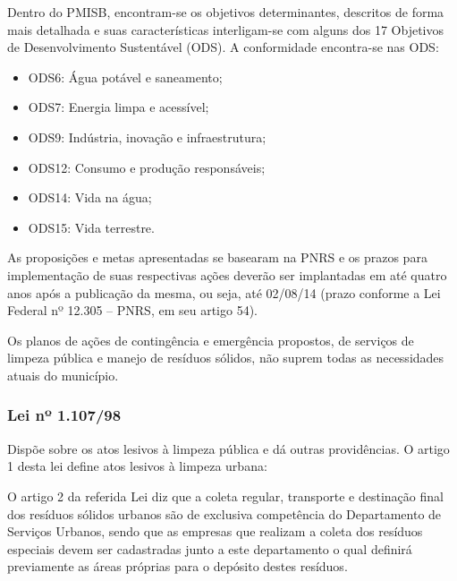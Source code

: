 	Dentro do PMISB, encontram-se os objetivos determinantes, descritos de forma mais detalhada e suas características interligam-se com alguns dos 17 Objetivos de Desenvolvimento Sustentável (ODS). A conformidade encontra-se nas ODS:

	\begin{itemize}
		\item ODS6: Água potável e saneamento;
		\item ODS7: Energia limpa e acessível;
		\item ODS9: Indústria, inovação e infraestrutura;
		\item ODS12: Consumo e produção responsáveis;
		\item ODS14: Vida na água;
		\item ODS15: Vida terrestre.
	\end{itemize}
	
	As proposições e metas apresentadas se basearam na PNRS e os prazos para implementação de suas respectivas ações deverão ser implantadas em até quatro anos após a publicação da mesma, ou seja, até 02/08/14 (prazo conforme a Lei Federal nº 12.305 – PNRS, em seu artigo 54).
	
	Os planos de ações de contingência e emergência propostos, de serviços de limpeza pública e manejo de resíduos sólidos, não suprem todas as necessidades atuais do município.
	
	\subsubsection{Lei nº 1.107/98}
	Dispõe sobre os atos lesivos à limpeza pública e dá outras providências. O artigo 1 desta lei define atos lesivos à limpeza urbana:
	
	
	O artigo 2 da referida Lei diz que a coleta regular, transporte e destinação final dos resíduos sólidos urbanos são de exclusiva competência do Departamento de Serviços Urbanos, sendo que as empresas que realizam a coleta dos resíduos especiais devem ser cadastradas junto a este departamento o qual definirá previamente as áreas próprias para o depósito destes resíduos.
	
